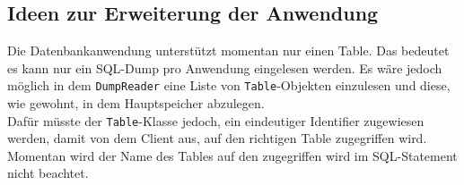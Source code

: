 \subsection{Ideen zur Erweiterung der Anwendung}
\label{Erweiterungen}
Die Datenbankanwendung unterstützt momentan nur einen Table. Das bedeutet es kann nur ein SQL-Dump pro Anwendung eingelesen werden.
Es wäre jedoch möglich in dem \texttt{DumpReader} eine Liste von \texttt{Table}-Objekten einzulesen und diese, wie gewohnt, in dem Hauptspeicher abzulegen.\\
Dafür müsste der \texttt{Table}-Klasse jedoch, ein eindeutiger Identifier zugewiesen werden, damit von dem Client aus, auf den richtigen Table zugegriffen wird.
Momentan wird der Name des Tables auf den zugegriffen wird im SQL-Statement nicht beachtet.
